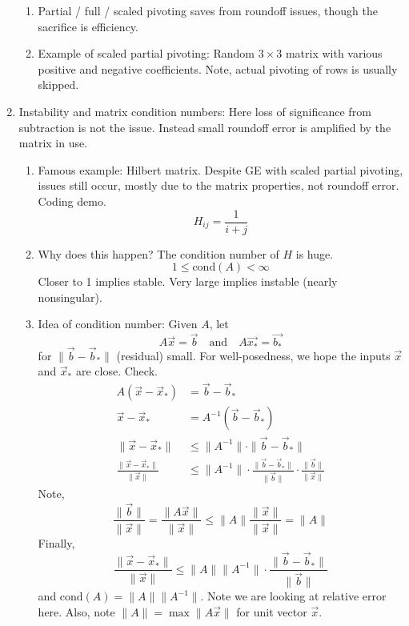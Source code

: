 \documentclass{article}
\theoremstyle{remark}
\begin{document}
\begin{enumerate}
\begin{enumerate}
\item Partial / full / scaled pivoting saves from roundoff issues, though the sacrifice is efficiency. 

\item Example of scaled partial pivoting: Random $3 \times 3$ matrix with various positive and negative coefficients. Note, actual pivoting of rows is usually skipped.
\end{enumerate}

\item Instability and matrix condition numbers: Here loss of significance from subtraction is not the issue. Instead small roundoff error is amplified by the matrix in use.
\begin{enumerate}
\item Famous example: Hilbert matrix. Despite GE with scaled partial pivoting, issues still occur, mostly due to the matrix properties, not roundoff error. Coding demo.
\[
H_{ij} = \frac{1}{i+j}
\]
\item Why does this happen? The condition number of $H$ is huge. 
\[
1 \leq \text{cond}(A) < \infty
\]
Closer to 1 implies stable. Very large implies instable (nearly nonsingular). 
\item Idea of condition number: Given $A$, let 
\[
A\vec{x}=\vec{b} \quad \text{and} \quad A\vec{x_*}=\vec{b_*}
\]
for $\|\vec{b}-\vec{b}_*\|$ (residual) small. For well-posedness, we hope the inputs $\vec{x}$ and $\vec{x}_*$ are close. Check.
\begin{align*}
A(\vec{x}-\vec{x}_*) &= \vec{b}-\vec{b}_* \\
\vec{x}-\vec{x}_* &= A^{-1}(\vec{b}-\vec{b}_*) \\
\|\vec{x} - \vec{x}_*\| &\leq \|A^{-1}\| \cdot \|\vec{b}-\vec{b}_*\| \\
\frac{\|\vec{x} - \vec{x}_*\|}{\|\vec{x}\|} &\leq \|A^{-1}\| \cdot \frac{\|\vec{b}-\vec{b}_*\|}{\|\vec{b}\|} \cdot \frac{\| \vec{b} \|}{\| \vec{x} \|}
\end{align*}
Note, 
\[
 \frac{\| \vec{b} \|}{\| \vec{x} \|} =  \frac{\| A\vec{x} \|}{\| \vec{x} \|} \leq  \|A \| \frac{\| \vec{x} \|}{\| \vec{x} \|} = \|A\|
\]
Finally, 
\[
\frac{\|\vec{x} - \vec{x}_*\|}{\|\vec{x}\|} \leq \|A\| \|A^{-1}\| \cdot \frac{\|\vec{b}-\vec{b}_*\|}{\|\vec{b}\|} 
\]
and $\text{cond}(A) =  \|A\| \|A^{-1}\|$. Note we are looking at relative error here. Also, note $\|A\| = \max \|A\vec{x}\| $ for unit vector $\vec{x}$.

\end{enumerate}
\end{enumerate}
\end{document}
